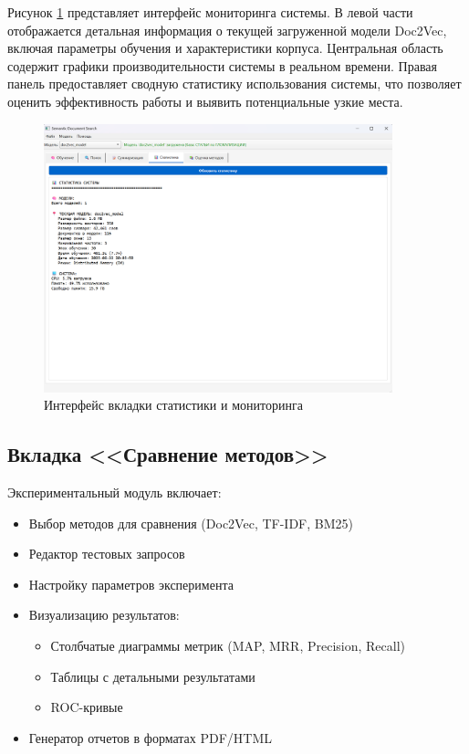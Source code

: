 Рисунок \ref{statistika} представляет интерфейс мониторинга системы. В левой части отображается детальная информация о текущей загруженной модели Doc2Vec, включая параметры обучения и характеристики корпуса. Центральная область содержит графики производительности системы в реальном времени. Правая панель предоставляет сводную статистику использования системы, что позволяет оценить эффективность работы и выявить потенциальные узкие места.
\begin{figure}[H]
	\centering
	\includegraphics[width=0.9\textwidth]{images/statistika.png}
	\caption{Интерфейс вкладки статистики и мониторинга}
	\label{statistika}
\end{figure}


\subsection{Вкладка <<Сравнение методов>>}

Экспериментальный модуль включает:
\begin{itemize}
	\item Выбор методов для сравнения (Doc2Vec, TF-IDF, BM25)
	\item Редактор тестовых запросов
	\item Настройку параметров эксперимента
	\item Визуализацию результатов:
	\begin{itemize}
		\item Столбчатые диаграммы метрик (MAP, MRR, Precision, Recall)
		\item Таблицы с детальными результатами
		\item ROC-кривые
	\end{itemize}
	\item Генератор отчетов в форматах PDF/HTML
\end{itemize}


